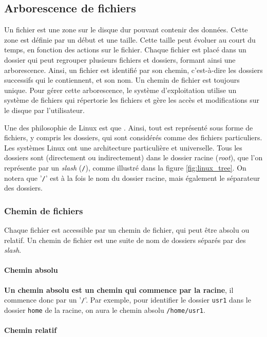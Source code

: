\subsection{Arborescence de fichiers} \label{sec:directories}
Un fichier est une zone sur le disque dur pouvant contenir des données. Cette zone est définie par un début et une taille. Cette taille peut évoluer au court du temps, en fonction des actions sur le fichier. Chaque fichier est placé dans un dossier qui peut regrouper plusieurs fichiers et dossiers, formant ainsi une arborescence. Ainsi, un fichier est identifié par son chemin, c'est-à-dire les dossiers successifs qui le contiennent, et son nom. Un chemin de fichier est toujours unique. Pour gérer cette arborescence, le système d'exploitation utilise un système de fichiers qui répertorie les fichiers et gère les accès et modifications sur le disque par l'utilisateur.

Une des philosophie de Linux est que \textbf{}. Ainsi, tout est représenté sous forme de fichiers, y compris les dossiers, qui sont considérés comme des fichiers particuliers. Les systèmes Linux ont une architecture particulière et universelle. Tous les dossiers sont (directement ou indirectement) dans le dossier racine (\textit{root}), que l'on représente par un \textit{slash} (\texttt{/}), comme illustré dans la figure \ref{fig:linux_tree}. On notera que '\texttt{/}' est à la fois le nom du dossier racine, mais également le séparateur des dossiers.

\subsubsection{Chemin de fichiers}

Chaque fichier est accessible par un chemin de fichier, qui peut être absolu ou relatif. Un chemin de fichier est une suite de nom de dossiers séparés par des \textit{slash}.

\paragraph{Chemin absolu}

\textbf{Un chemin absolu est un chemin qui commence par la racine}, il commence donc par un '\texttt{/}'. Par exemple, pour identifier le dossier \texttt{usr1} dans le dossier \texttt{home} de la racine, on aura le chemin absolu \texttt{/home/usr1}.

\paragraph{Chemin relatif}

